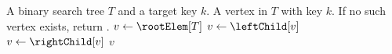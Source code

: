 
\begin{algorithmic}[1]
\Require A binary search tree $T$ and a target key $k$.
\Ensure A vertex in $T$ with key $k$. If no such vertex exists, return \MyNull.
\State $v \gets \rootElem[T]$
    \State $v \gets \leftChild[v]$
  \Else
    \State $v \gets \rightChild[v]$
  \EndIf
\EndWhile
\State \Return $v$
\end{algorithmic}
